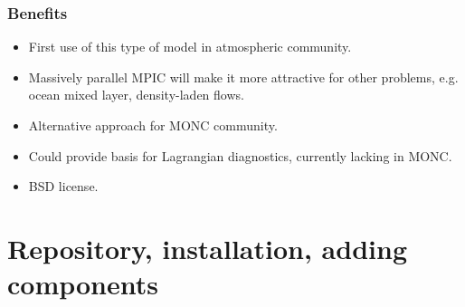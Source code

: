 \documentclass{beamer}
\def\gr#1{\color{dark_green} #1}
\def\re#1{\color{red}   #1}
\def\bl#1{\color{blue}  #1}
\def\pu#1{\color{purple} #1}
\begin{document}
\begin{frame}
\frametitle{Benefits}

\begin{itemize}
\item First use of this type of model in atmospheric community.
\item Massively parallel MPIC will make it more attractive for {\pu other problems}, e.g. ocean mixed layer, density-laden flows.
\item {\bl Alternative approach} for MONC community.
\item Could provide basis for Lagrangian diagnostics, currently {\re lacking in MONC}.
\item {\gr BSD} license.
\end{itemize}

\end{frame}

\hypertarget{welcome-to-the-pmpic-wiki}{%
\section{Repository, installation, adding components}\label{welcome-to-the-pmpic-wiki}}
\end{document}
